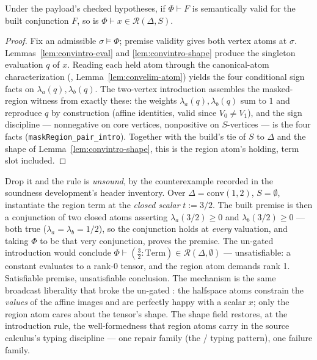 \begin{bthm}\label{thm:convintro-sound}
Under the payload's checked hypotheses, if $\Phi \vdash F$ is
semantically valid for the built conjunction $F$, so is
$\Phi \vdash x \in \mathcal{R}(\Delta, S)$.
\end{bthm}
\begin{proof}
Fix an admissible $\sigma \models \Phi$; premise validity gives both
vertex atoms at $\sigma$. Lemmas~\ref{lem:convintro-eval} and
\ref{lem:convintro-shape} produce the singleton evaluation $q$ of $x$.
Reading each held atom through the canonical-atom characterization
(, Lemma~\ref{lem:convelim-atom}) yields the four
conditional sign facts on $\lambda_a(q), \lambda_b(q)$. The two-vertex
introduction assembles the masked-region witness from exactly these: the
weights $\lambda_a(q), \lambda_b(q)$ sum to $1$ and reproduce $q$ by
construction (affine identities, valid since $V_0 \neq V_1$), and the
sign discipline --- nonnegative on core vertices, nonpositive on
$S$-vertices --- is the four facts (\texttt{maskRegion\_pair\_intro}).
Together with the build's tie of $S$ to $\Delta$ and the shape of
Lemma~\ref{lem:convintro-shape}, this is the region atom's holding, term
slot included.
\end{proof}

\begin{bremark}
\label{rem:convintro-cex}
Drop it and the rule is \emph{unsound}, by the counterexample recorded in
the soundness development's header inventory. Over $\Delta =
\mathrm{conv}(1, 2)$, $S = \emptyset$, instantiate the region term at the
\emph{closed scalar} $t := 3/2$. The built premise is then a conjunction
of two closed atoms asserting $\lambda_a(3/2) \geq 0$ and
$\lambda_b(3/2) \geq 0$ --- both true ($\lambda_a = \lambda_b = 1/2$), so
the conjunction holds at \emph{every} valuation, and taking $\Phi$ to be
that very conjunction,  proves the premise. The un-gated
introduction would conclude
$\Phi \vdash (\tfrac{3}{2} : \mathrm{Term}) \in \mathcal{R}(\Delta,
\emptyset)$ --- unsatisfiable: a constant evaluates to a rank-0 tensor,
and the region atom demands rank 1. Satisfiable premise, unsatisfiable
conclusion. The mechanism is the same broadcast liberality that broke the
un-gated : the halfspace atoms constrain the
\emph{values} of the affine images and are perfectly happy with a scalar
$x$; only the region atom cares about the tensor's shape. The shape field
restores, at the introduction rule, the well-formedness that region
atoms carry in the source calculus's typing discipline --- one repair
family (the / typing pattern), one
failure family.
\end{bremark}

